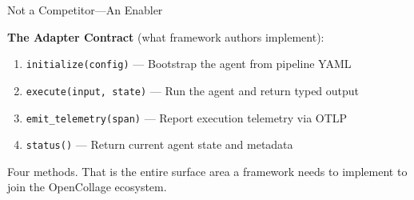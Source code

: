 \begin{frame}{Not a Competitor---An Enabler}
  \vspace{0.1cm}

  \fontsize{6}{7}\selectfont
  \textbf{The Adapter Contract} (what framework authors implement):
  \begin{enumerate}
    \item \texttt{initialize(config)} --- Bootstrap the agent from pipeline YAML
    \item \texttt{execute(input, state)} --- Run the agent and return typed output
    \item \texttt{emit\_telemetry(span)} --- Report execution telemetry via OTLP
    \item \texttt{status()} --- Return current agent state and metadata
  \end{enumerate}
  \vspace{-0.2cm}
  \begin{exampleblock}{}
    \fontsize{6}{7}\selectfont
    Four methods. That is the entire surface area a framework needs to implement
    to join the OpenCollage ecosystem.
  \end{exampleblock}
\end{frame}
